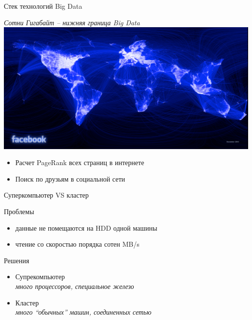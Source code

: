 \documentclass[10pt,a4paper]{beamer}
\begin{document}
\begin{frame}{Стек технологий Big Data}

\vspace{-1em}
\begin{center}
{\it Сотни Гигабайт -- нижняя граница Big Data}
\includegraphics[scale=0.13]{images/facebook.png}
\end{center}
\vspace{-1em}
\begin{itemize}
\item Расчет PageRank всех страниц в интернете
\item Поиск по друзьям в социальной сети
\end{itemize}

\end{frame}


\begin{frame}{Суперкомпьютер VS кластер}

Проблемы
\begin{itemize}
\item данные не помещаются на HDD одной машины 
\item чтение со скоростью порядка сотен MB/s
\end{itemize}

Решения
\begin{itemize}
\item Супрекомпьютер \\
{\it много процессоров, специальное железо}
\item Кластер \\
{\it много ``обычных'' машин, соединенных сетью}
\end{itemize}

\end{frame}

\end{document}
